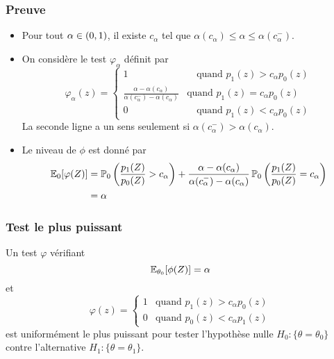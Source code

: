 \begin{frame}
\frametitle{Preuve}
\begin{itemize}
\item Pour tout $\alpha \in \left(0,1\right)$, il existe $c_\alpha$ tel que $\alpha(c_\alpha) \leq \alpha \leq \alpha(c_\alpha^-)$.
\item On considère le test $\varphi_\alpha$ définit par
$$
\varphi_\alpha(z)
=
\begin{cases}
1 & \quad \text{quand $p_1(z) > c_\alpha p_0(z)$} \\
\frac{\alpha - \alpha(c_\alpha)}{\alpha(c_\alpha^-)-\alpha(c_\alpha)} & \text{quand $p_1(z) = c_\alpha p_0(z)$} \\
0  & \quad \text{quand $p_1(z) < c_\alpha p_0(z)$}
\end{cases}
$$
La seconde ligne a un sens seulement si $\alpha(c_\alpha^-)  > \alpha(c_\alpha)$.
\item Le niveau de $\phi$ est donné par
\begin{align*}
\operatorname{{\mathbb E}}_0[\varphi(Z)] &= \operatorname{{\mathbb P}}_0 \left( \frac{p_1(Z)}{p_0(Z)} > c_\alpha \right) + \frac{\alpha-\alpha(c_\alpha)}{\alpha(c_\alpha^-)-\alpha(c_\alpha)}
\operatorname{{\mathbb P}}_0\left( \frac{p_1(Z)}{p_0(Z)} = c_\alpha \right) \\
&= \alpha
\end{align*}
\end{itemize}
\end{frame}


\begin{frame}
\frametitle{Test le plus puissant}
\begin{theorem}
Un test $\varphi$ vérifiant 
$$
\operatorname{{\mathbb E}}_{\theta_0}[\phi(Z)]= \alpha
$$
et
\[
\varphi(z)=
\begin{cases}
1 & \text{quand $p_1(z) > c_\alpha p_0(z)$} \\
0 & \text{quand $p_0(z) < c_\alpha p_1(z)$}
\end{cases}
\]
est \alert{uniformément le plus puissant} pour tester l'hypothèse nulle $H_0: \{\theta = \theta_0\}$ contre l'alternative $H_1: \{\theta = \theta_1\}$.
\end{theorem}
\end{frame}

